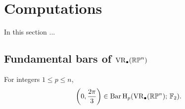 
\section{Computations}\label{s:computations}

In this section ...

\subsection{Fundamental bars of $\operatorname{VR}_\bullet(\mathbb{RP}^n)$}

\begin{lemma} \label{prop:RPn bar}
	For integers $1 \leq p \leq n$,
	\[
	\left(0, \frac{2\pi}{3}\right) \in \operatorname{Bar} \operatorname{H}_{p}(\operatorname{VR}_\bullet(\mathbb{RP}^n);\,{\mathbb{F}_2}).
	\]
\end{lemma}


